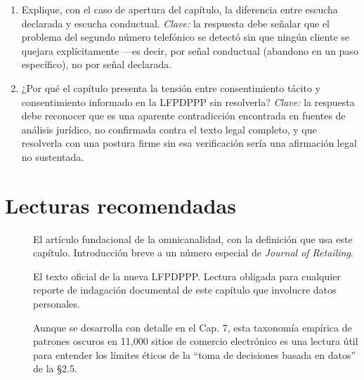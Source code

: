 \begin{enumerate}
  \item Explique, con el caso de apertura del capítulo, la diferencia entre
  escucha declarada y escucha conductual. \textit{Clave:} la respuesta debe
  señalar que el problema del segundo número telefónico se detectó sin que
  ningún cliente se quejara explícitamente —es decir, por señal conductual
  (abandono en un paso específico), no por señal declarada.
  \item ¿Por qué el capítulo presenta la tensión entre consentimiento tácito
  y consentimiento informado en la LFPDPPP sin resolverla?
  \textit{Clave:} la respuesta debe reconocer que es una aparente
  contradicción encontrada en fuentes de análisis jurídico, no confirmada
  contra el texto legal completo, y que resolverla con una postura firme sin
  esa verificación sería una afirmación legal no sustentada.
\end{enumerate}

\section{Lecturas recomendadas}

\begin{description}
  \item[\textcite{verhoef2015}] El artículo fundacional de la omnicanalidad,
  con la definición que usa este capítulo. Introducción breve a un número
  especial de \textit{Journal of Retailing}.
  \item[\textcite{dof_lfpdppp2025}] El texto oficial de la nueva LFPDPPP.
  Lectura obligada para cualquier reporte de indagación documental de este
  capítulo que involucre datos personales.
  \item[\textcite{mathur2019}] Aunque se desarrolla con detalle en el Cap. 7,
  esta taxonomía empírica de patrones oscuros en 11{,}000 sitios de comercio
  electrónico es una lectura útil para entender los límites éticos de la
  \enquote{toma de decisiones basada en datos} de la §2.5.
\end{description}
